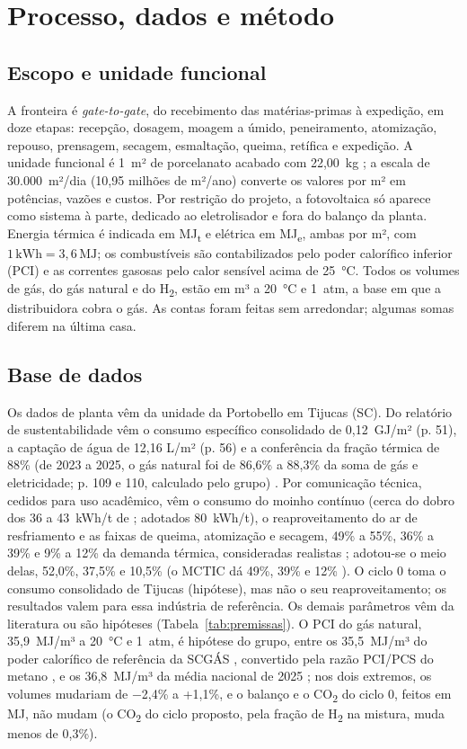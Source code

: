 \documentclass[10pt,a4paper,twocolumn]{article}
\newcommand{\MJt}{MJ\textsubscript{t}}
\newcommand{\MJe}{MJ\textsubscript{e}}
\newcommand{\Ht}{H\textsubscript{2}}
\newcommand{\COt}{CO\textsubscript{2}}
\newcommand{\un}[1]{\,\mathrm{#1}}
\begin{document}
\section{Processo, dados e método}

\subsection{Escopo e unidade funcional}

A fronteira é \textit{gate-to-gate}, do recebimento das matérias-primas à expedição, em doze etapas: recepção, dosagem, moagem a úmido, peneiramento, atomização, repouso, prensagem, secagem, esmaltação, queima, retífica e expedição. A unidade funcional é 1~m² de porcelanato acabado com 22,00~kg \cite{alves2023a}; a escala de 30.000~m²/dia (10,95 milhões de m²/ano) converte os valores por m² em potências, vazões e custos. Por restrição do projeto, a fotovoltaica só aparece como sistema à parte, dedicado ao eletrolisador e fora do balanço da planta. Energia térmica é indicada em \MJt{} e elétrica em \MJe, ambas por m², com $1\un{kWh}=3{,}6\un{MJ}$; os combustíveis são contabilizados pelo poder calorífico inferior (PCI) e as correntes gasosas pelo calor sensível acima de 25~°C. Todos os volumes de gás, do gás natural e do \Ht, estão em m³ a 20~°C e 1~atm, a base em que a distribuidora cobra o gás. As contas foram feitas sem arredondar; algumas somas diferem na última casa.

\subsection{Base de dados}\label{sec:dados}

Os dados de planta vêm da unidade da Portobello em Tijucas (SC). Do relatório de sustentabilidade vêm o consumo específico consolidado de 0,12~GJ/m² (p. 51), a captação de água de 12,16 L/m² (p. 56) e a conferência da fração térmica de 88\% (de 2023 a 2025, o gás natural foi de 86,6\% a 88,3\% da soma de gás e eletricidade; p. 109 e 110, calculado pelo grupo) \cite{portobello2025}. Por comunicação técnica, cedidos para uso acadêmico, vêm o consumo do moinho contínuo (cerca do dobro dos 36 a 43~kWh/t de \cite{alves2023b}; adotados 80~kWh/t), o reaproveitamento do ar de resfriamento e as faixas de queima, atomização e secagem, 49\% a 55\%, 36\% a 39\% e 9\% a 12\% da demanda térmica, consideradas realistas \cite{rigobelo2026}; adotou-se o meio delas, 52,0\%, 37,5\% e 10,5\% (o MCTIC dá 49\%, 39\% e 12\% \cite{mctic2017}). O ciclo 0 toma o consumo consolidado de Tijucas (hipótese), mas não o seu reaproveitamento; os resultados valem para essa indústria de referência. Os demais parâmetros vêm da literatura ou são hipóteses (Tabela~\ref{tab:premissas}). O PCI do gás natural, 35,9~MJ/m³ a 20~°C e 1~atm, é hipótese do grupo, entre os 35,5~MJ/m³ do poder calorífico de referência da SCGÁS \cite{scgas2026}, convertido pela razão PCI/PCS do metano \cite{cengel2013}, e os 36,8~MJ/m³ da média nacional de 2025 \cite{anp2026}; nos dois extremos, os volumes mudariam de −2,4\% a +1,1\%, e o balanço e o \COt{} do ciclo 0, feitos em MJ, não mudam (o \COt{} do ciclo proposto, pela fração de \Ht{} na mistura, muda menos de 0,3\%).
\end{document}
